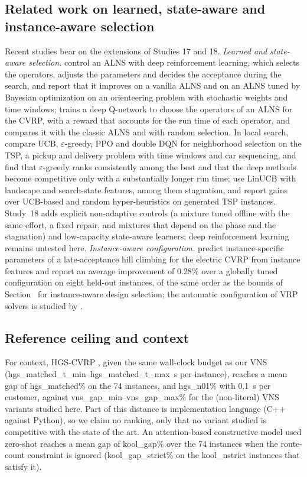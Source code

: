 \subsection{Related work on learned, state-aware and instance-aware selection}\label{sec:concurrent}
Recent studies bear on the extensions of Studies 17 and 18. \emph{Learned and state-aware selection.} \citet{reijnen2024} control an ALNS with deep reinforcement learning, which selects the operators, adjusts the parameters and decides the acceptance during the search, and report that it improves on a vanilla ALNS and on an ALNS tuned by Bayesian optimization on an orienteering problem with stochastic weights and time windows; \citet{dudel2026} trains a deep Q-network to choose the operators of an ALNS for the CVRP, with a reward that accounts for the run time of each operator, and compares it with the classic ALNS and with random selection. In local search, \citet{molinghen2026} compare UCB, $\varepsilon$-greedy, PPO and double DQN for neighborhood selection on the TSP, a pickup and delivery problem with time windows and car sequencing, and find that $\varepsilon$-greedy ranks consistently among the best and that the deep methods become competitive only with a substantially longer run time; \citet{wei2026} use LinUCB with landscape and search-state features, among them stagnation, and report gains over UCB-based and random hyper-heuristics on generated TSP instances. Study~18 adds explicit non-adaptive controls (a mixture tuned offline with the same effort, a fixed repair, and mixtures that depend on the phase and the stagnation) and low-capacity state-aware learners; deep reinforcement learning remains untested here. \emph{Instance-aware configuration.} \citet{qin2026} predict instance-specific parameters of a late-acceptance hill climbing for the electric CVRP from instance features and report an average improvement of 0.28\% over a globally tuned configuration on eight held-out instances, of the same order as the bounds of Section~ for instance-aware design selection; the automatic configuration of VRP solvers is studied by \citet{rasku2019}.

\subsection{Reference ceiling and context}\label{sec:ceiling}
For context, HGS-CVRP \citep{vidal2022}, given the same wall-clock budget as our VNS (\num{hgs_matched_t_min}--\num{hgs_matched_t_max}~s per instance), reaches a mean gap of \num{hgs_matched}\% on the 74 instances, and \num{hgs_n01}\% with 0.1~s per customer, against \num{vns_gap_min}--\num{vns_gap_max}\% for the (non-literal) VNS variants studied here. Part of this distance is implementation language (C++ against Python), so we claim no ranking, only that no variant studied is competitive with the state of the art. An attention-based constructive model \citep{kool2019} used zero-shot reaches a mean gap of \num{kool_gap}\% over the 74 instances when the route-count constraint is ignored (\num{kool_gap_strict}\% on the \num{kool_nstrict} instances that satisfy it).
